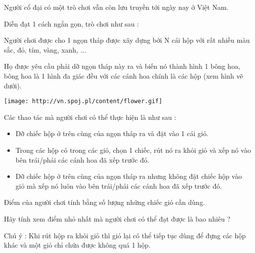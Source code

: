 Người cổ đại có một trò chơi vẫn còn lưu truyền tới ngày nay ở   Việt Nam.   


   Diễn đạt 1 cách ngắn gọn, trò chơi như sau :   


   Người chơi được cho 1 ngọn tháp được xây dựng bởi N cái   hộp với rất nhiều màu sắc, đỏ, tím, vàng, xanh, ...   


   Họ được yêu cầu phải dỡ ngọn tháp này ra và biến nó thành   hình 1 bông hoa, bông hoa là 1 hình đa giác đều với các cánh   hoa chính là các hộp (xem hình vẽ dưới).   



\texttt{[image: http://vn.spoj.pl/content/flower.gif]}




   Các thao tác mà người chơi có thể thực hiện là như sau :   



\begin{itemize}
	\item     Dỡ chiếc hộp ở trên cùng của ngọn tháp ra và đặt vào 1 cái   giỏ.   
	\item     Trong các hộp có trong các giỏ, chọn 1 chiếc, rút nó ra   khỏi giỏ và xếp nó vào bên trái/phải các cánh hoa đã xếp trước   đó.   
	\item     Dỡ chiếc hộp ở trên cùng của ngọn tháp ra nhưng không   đặt chiếc hộp vào giỏ mà xếp nó luôn vào bên trái/phải các   cánh hoa đã xếp trước đó.   
\end{itemize}

   Điểm của người chơi tính bằng số lượng những chiếc giỏ cần   dùng.   


   Hãy tính xem điểm nhỏ nhất mà người chơi có thể đạt được là   bao nhiêu ?   





       Chú ý      : Khi rút hộp ra khỏi giỏ thì giỏ lại có thể tiếp   tục dùng để đựng các hộp khác và một giỏ chỉ chứa được   không quá 1 hộp.